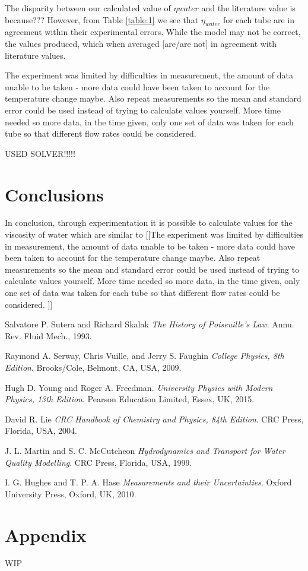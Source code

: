\documentclass[twocolumn]{revtex4}
\begin{document}
The disparity between our calculated value of $\eta{water}$ and the literature value is because???
However, from Table \ref{table:1} we see that $\eta_{water}$ for each tube are in agreement within their experimental errors. While the model may not be correct, the values produced, which when averaged [are/are not] in agreement with literature values. 

The experiment was limited by difficulties in measurement, the amount of data unable to be taken - more data could have been taken to account for the temperature change maybe. Also repeat measurements so the mean and standard error could be used instead of trying to calculate values yourself. More time needed so more data, in the time given, only one set of data was taken for each tube so that different flow rates could be considered. 

USED SOLVER!!!!!

\vspace{-5ex}
\section{Conclusions}
\vspace{-2ex}
 
In conclusion, through experimentation it is possible to calculate values for the viscosity of water which are similar to [[The experiment was limited by difficulties in measurement, the amount of data unable to be taken - more data could have been taken to account for the temperature change maybe. Also repeat measurements so the mean and standard error could be used instead of trying to calculate values yourself. More time needed so more data, in the time given, only one set of data was taken for each tube so that different flow rates could be considered. ]]

\begin{thebibliography}{5}
	Salvatore P. Sutera and Richard Skalak
	\textit{The History of Poiseuille's Law}.
	Annu. Rev. Fluid Mech., 1993.
	
	Raymond A. Serway, Chris Vuille, and Jerry S. Faughin
	\textit{College Physics, 8th Edition}.
	Brooks/Cole, Belmont, CA, USA, 2009.

	Hugh D. Young and Roger A. Freedman.
	\textit{University Physics with Modern Physics, 13th Edition}. 
	Pearson Education Limited, Essex, UK, 2015.
	
	David R. Lie
	\textit{CRC Handbook of Chemistry and Physics, 84th Edition}. 
	CRC Press, Florida, USA, 2004.
	
	J. L. Martin and S. C. McCutcheon
	\textit{Hydrodynamics and Transport for Water Quality Modelling}. 
	CRC Press, Florida, USA, 1999.
	
	I. G. Hughes and T. P. A. Hase
	\textit{Measurements and their Uncertainties}. 
	Oxford University Press, Oxford, UK, 2010.
	
\end{thebibliography}
\clearpage

\vfill
\twocolumngrid
\vspace{-3ex}
\section*{Appendix}
\vspace{-2ex}

WIP

\clearpage
\end{document}
